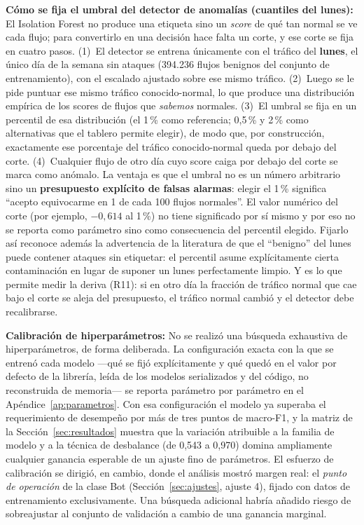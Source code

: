 \documentclass[11pt,a4paper]{article}
\begin{document}
\noindent\textbf{Cómo se fija el umbral del detector de anomalías (cuantiles
del lunes):} El Isolation Forest no produce una etiqueta
sino un \emph{score} de qué tan normal se ve cada flujo; para convertirlo en
una decisión hace falta un corte, y ese corte se fija en cuatro pasos.
(1)~El detector se entrena únicamente con el tráfico del \textbf{lunes}, el
único día de la semana sin ataques (394.236 flujos benignos del conjunto de
entrenamiento), con el escalado ajustado sobre ese mismo tráfico. (2)~Luego
se le pide puntuar ese mismo tráfico conocido-normal, lo que produce una
distribución empírica de los scores de flujos que \emph{sabemos} normales.
(3)~El umbral se fija en un percentil de esa distribución (el 1\,\% como
referencia; 0,5\,\% y 2\,\% como alternativas que el tablero permite elegir),
de modo que, por construcción, exactamente ese porcentaje del tráfico
conocido-normal queda por debajo del corte. (4)~Cualquier flujo de otro día
cuyo score caiga por debajo del corte se marca como anómalo. La ventaja es
que el umbral no es un número arbitrario sino un \textbf{presupuesto
explícito de falsas alarmas}: elegir el 1\,\% significa ``acepto equivocarme
en 1 de cada 100 flujos normales''. El valor numérico del corte (por ejemplo,
$-0{,}614$ al 1\,\%) no tiene significado por sí mismo y por eso no se
reporta como parámetro sino como consecuencia del percentil elegido. Fijarlo
así reconoce además la advertencia de la literatura de que el ``benigno'' del
lunes puede contener ataques sin etiquetar: el percentil asume explícitamente
cierta contaminación en lugar de suponer un lunes perfectamente limpio. Y es
lo que permite medir la deriva (R11): si en otro día la fracción de tráfico
normal que cae bajo el corte se aleja del presupuesto, el tráfico normal
cambió y el detector debe recalibrarse.

\noindent\textbf{Calibración de hiperparámetros:} No se realizó una búsqueda
exhaustiva de hiperparámetros, de forma deliberada. La configuración exacta
con la que se entrenó cada modelo ---qué se fijó explícitamente y qué quedó en
el valor por defecto de la librería, leída de los modelos serializados y del
código, no reconstruida de memoria--- se reporta parámetro por parámetro en
el Apéndice~\ref{ap:parametros}. Con esa configuración el modelo ya superaba
el requerimiento de desempeño por más de tres puntos de macro-F1, y la matriz
de la Sección~\ref{sec:resultados} muestra que la variación atribuible a la
familia de modelo y a la técnica de desbalance (de 0,543 a 0,970) domina
ampliamente cualquier ganancia esperable de un ajuste fino de parámetros. El
esfuerzo de calibración se dirigió, en cambio, donde el análisis mostró
margen real: el \emph{punto de operación} de la clase Bot
(Sección~\ref{sec:ajustes}, ajuste 4), fijado con datos de entrenamiento
exclusivamente. Una búsqueda adicional habría añadido riesgo de sobreajustar
al conjunto de validación a cambio de una ganancia marginal.
\end{document}

